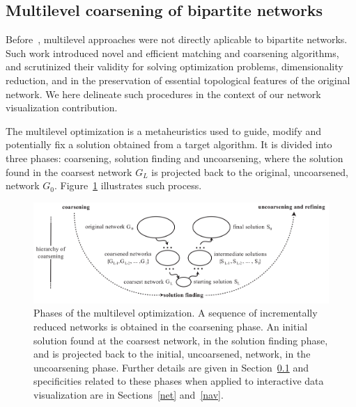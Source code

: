 \documentclass[runningheads]{llncs}
\begin{document}
\subsection{Multilevel coarsening of bipartite networks}\label{bac}
Before~\cite{alan2}, multilevel approaches were not directly aplicable to bipartite networks.
Such work introduced novel and efficient matching and coarsening algorithms,
and scrutinized their validity for solving optimization problems, dimensionality reduction,
and in the preservation of essential topological features of the original network.
We here delineate such procedures in the context of our network visualization contribution.

The multilevel optimization is a metaheuristics used to guide,
modify and potentially fix a solution obtained from a target algorithm.
It is divided into three phases: coarsening, solution finding and uncoarsening,
where the solution found in the coarsest network $G_L$ is projected back to the original,
uncoarsened, network $G_0$.
Figure~\ref{mlf} illustrates such process.

\begin{figure}[!h]\centering
 \includegraphics[width=\textwidth]{mlf}
  \caption{Phases of the multilevel optimization.
  A sequence of incrementally reduced networks is obtained in the coarsening phase.
  An initial solution found at the coarsest network, in the solution finding phase,
  and is projected back to the initial, uncoarsened, network, in the uncoarsening phase.
  Further details are given in Section~\ref{bac} and specificities related to these
  phases when applied to interactive data visualization are in Sections~\ref{net} and~\ref{nav}.
  }\label{mlf}
\end{figure}
\end{document}
